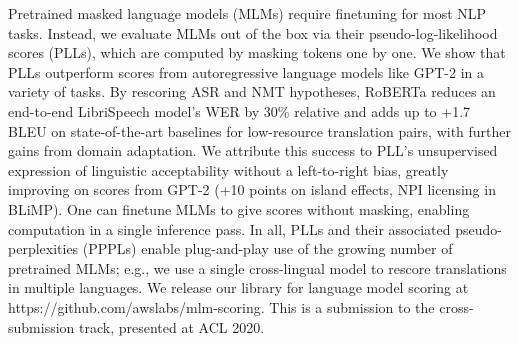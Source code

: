 Pretrained masked language models (MLMs) require finetuning for most NLP tasks. Instead, we evaluate MLMs out of the box via their pseudo-log-likelihood scores (PLLs), which are computed by masking tokens one by one. We show that PLLs outperform scores from autoregressive language models like GPT-2 in a variety of tasks. By rescoring ASR and NMT hypotheses, RoBERTa reduces an end-to-end LibriSpeech model's WER by 30\% relative and adds up to +1.7 BLEU on state-of-the-art baselines for low-resource translation pairs, with further gains from domain adaptation. We attribute this success to PLL's unsupervised expression of linguistic acceptability without a left-to-right bias, greatly improving on scores from GPT-2 (+10 points on island effects, NPI licensing in BLiMP). One can finetune MLMs to give scores without masking, enabling computation in a single inference pass. In all, PLLs and their associated pseudo-perplexities (PPPLs) enable plug-and-play use of the growing number of pretrained MLMs; e.g., we use a single cross-lingual model to rescore translations in multiple languages. We release our library for language model scoring at https://github.com/awslabs/mlm-scoring. This is a submission to the cross-submission track, presented at ACL 2020.
